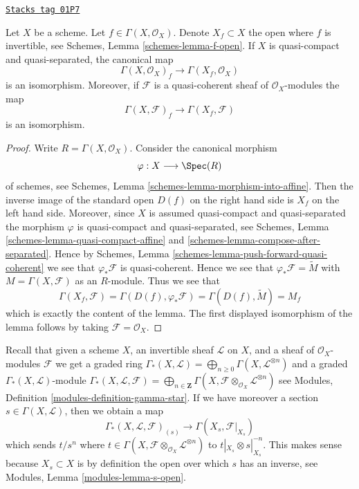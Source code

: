 \begin{lemma}
\label{properties-lemma-invert-f-sections}
\href{https://stacks.math.columbia.edu/tag/01P7}{\texttt{Stacks tag 01P7}}


Let $X$ be a scheme. Let $f \in \Gamma(X, \mathcal{O}_X)$.
Denote $X_f \subset X$ the open where $f$ is invertible, see
Schemes, Lemma \ref{schemes-lemma-f-open}.
If $X$ is quasi-compact and quasi-separated, the canonical map
$$
\Gamma(X, \mathcal{O}_X)_f \longrightarrow \Gamma(X_f, \mathcal{O}_X)
$$
is an isomorphism. Moreover, if $\mathcal{F}$ is a quasi-coherent
sheaf of $\mathcal{O}_X$-modules the map
$$
\Gamma(X, \mathcal{F})_f \longrightarrow \Gamma(X_f, \mathcal{F})
$$
is an isomorphism.
\end{lemma}

\begin{proof}
Write $R = \Gamma(X, \mathcal{O}_X)$. Consider the canonical morphism
$$
\varphi : X \longrightarrow \Spec(R)
$$
of schemes, see
Schemes, Lemma
\ref{schemes-lemma-morphism-into-affine}.
Then the inverse image of the standard open $D(f)$ on the
right hand side is $X_f$ on the left hand side.
Moreover, since $X$ is assumed quasi-compact and quasi-separated
the morphism $\varphi$ is quasi-compact and quasi-separated,
see Schemes, Lemma \ref{schemes-lemma-quasi-compact-affine} and
\ref{schemes-lemma-compose-after-separated}. Hence by
Schemes, Lemma \ref{schemes-lemma-push-forward-quasi-coherent}
we see that $\varphi_*\mathcal{F}$ is quasi-coherent.
Hence we see that $\varphi_*\mathcal{F} = \widetilde M$
with $M = \Gamma(X, \mathcal{F})$ as an $R$-module.
Thus we see that
$$
\Gamma(X_f, \mathcal{F}) =
\Gamma(D(f), \varphi_*\mathcal{F}) =
\Gamma(D(f), \widetilde M) = M_f
$$
which is exactly the content of the lemma. The first displayed isomorphism
of the lemma follows by taking $\mathcal{F} = \mathcal{O}_X$.
\end{proof}

Recall that given a scheme $X$, an invertible sheaf $\mathcal{L}$
on $X$, and a sheaf of $\mathcal{O}_X$-modules $\mathcal{F}$
we get a graded ring
$\Gamma_*(X, \mathcal{L}) =
\bigoplus\nolimits_{n \geq 0} \Gamma(X, \mathcal{L}^{\otimes n})$
and a graded $\Gamma_*(X, \mathcal{L})$-module
$\Gamma_*(X, \mathcal{L}, \mathcal{F}) =
\bigoplus\nolimits_{n \in \mathbf{Z}}
\Gamma(X, \mathcal{F} \otimes_{\mathcal{O}_X} \mathcal{L}^{\otimes n})$
see Modules, Definition \ref{modules-definition-gamma-star}.
If we have moreover a section $s \in \Gamma(X, \mathcal{L})$, then
we obtain a map
\begin{equation}
\label{equation-module-invert-s}
\Gamma_*(X, \mathcal{L}, \mathcal{F})_{(s)}
\longrightarrow
\Gamma(X_s, \mathcal{F}|_{X_s})
\end{equation}
which sends $t/s^n$ where
$t \in \Gamma(X, \mathcal{F} \otimes_{\mathcal{O}_X} \mathcal{L}^{\otimes n})$
to $t|_{X_s} \otimes s|_{X_s}^{-n}$. This makes sense
because $X_s \subset X$ is by definition the open over which
$s$ has an inverse, see Modules, Lemma \ref{modules-lemma-s-open}.

